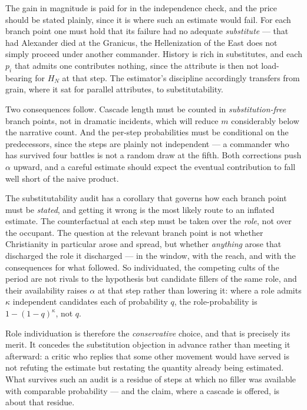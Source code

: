 \begin{remark}\label{gc:rem:serialcost}
The gain in magnitude is paid for in the independence check, and the
price should be stated plainly, since it is where such an estimate would
fail. For each branch point one must hold that its failure had no adequate
\emph{substitute} --- that had Alexander died at the Granicus, the
Hellenization of the East does not simply proceed under another
commander. History is rich in substitutes, and each $p_i$ that admits
one contributes nothing, since the attribute is then not load-bearing
for $H_N$ at that step. The estimator's discipline accordingly transfers
from grain, where it sat for parallel attributes, to substitutability.

Two consequences follow. Cascade length must be counted in
\emph{substitution-free} branch points, not in dramatic incidents, which
will reduce $m$ considerably below the narrative count. And the
per-step probabilities must be conditional on the predecessors, since
the steps are plainly not independent --- a commander who has survived
four battles is not a random draw at the fifth. Both corrections push
$\alpha$ upward, and a careful estimate should expect the eventual
contribution to fall well short of the naive product.

\begin{remark}\label{gc:rem:roleindividuation}
The substitutability audit has a corollary that governs how each branch
point must be \emph{stated}, and getting it wrong is the most likely
route to an inflated estimate. The counterfactual at each step must be taken over the \emph{role}, not
over the occupant. The question at the relevant branch point is not
whether Christianity in particular arose and spread, but whether
\emph{anything} arose that discharged the role it discharged --- in the
window, with the reach, and with the consequences for what followed. So
individuated, the competing cults of the period are not rivals to the
hypothesis but candidate fillers of the same role, and their availability
raises $\alpha$ at that step rather than lowering it: where a role admits
$\kappa$ independent candidates each of probability $q$, the
role-probability is $1-(1-q)^{\kappa}$, not $q$.

Role individuation is therefore the \emph{conservative} choice, and that
is precisely its merit. It concedes the substitution objection in
advance rather than meeting it afterward: a critic who replies that some
other movement would have served is not refuting the estimate but
restating the quantity already being estimated. What survives such an
audit is a residue of steps at which no filler was available with
comparable probability --- and the claim, where a cascade is offered, is
about that residue.


\end{remark}
\end{remark}
